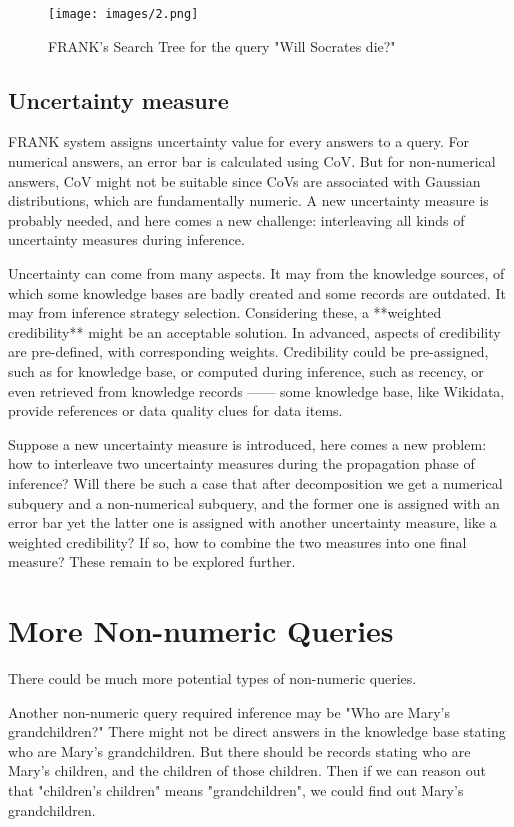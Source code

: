 \documentclass[12pt]{extarticle}
\begin{document}
\begin{figure}
    \centering
    \texttt{[image: images/2.png]}
    \caption{FRANK's Search Tree for the query "Will Socrates die?"}
    \label{Fig:2}
\end{figure}

\subsection{Uncertainty measure}
FRANK system assigns uncertainty value for every answers to a query. For numerical answers, an error bar is calculated using CoV. But for non-numerical answers, CoV might not be suitable since CoVs are associated with Gaussian distributions, which are fundamentally numeric. A new uncertainty measure is probably  needed, and here comes a new challenge: interleaving all kinds of uncertainty measures during inference. 

Uncertainty can come from many aspects. It may from the knowledge sources, of which some knowledge bases are badly created and some records are outdated. It may from inference strategy selection. Considering these, a **weighted credibility** might be an acceptable solution. In advanced, aspects of credibility are pre-defined, with corresponding weights. Credibility could be pre-assigned, such as for knowledge base, or computed during inference, such as  recency, or even retrieved from knowledge records —— some knowledge base, like Wikidata\cite{vrandevcic2014wikidata}, provide references or data quality clues for data items. 

Suppose a new uncertainty measure is introduced, here comes a new problem: how to interleave two uncertainty measures during the propagation phase of inference? Will there be such a case that after decomposition we get a numerical subquery and a non-numerical subquery, and the former one is assigned with an error bar yet the latter one is assigned  with another uncertainty measure, like a weighted credibility? If so, how to combine the two measures into one final measure? These remain to be explored further.


\section{More Non-numeric Queries}
There could be much more potential types of non-numeric queries.

Another non-numeric query required inference may be "Who are Mary's grandchildren?"  There might not be direct answers in the knowledge base stating who are Mary's grandchildren. But there should be records stating who are Mary's children, and the children of those children. Then if we can reason out that "children's children" means "grandchildren", we could find out Mary's grandchildren.
\end{document}
